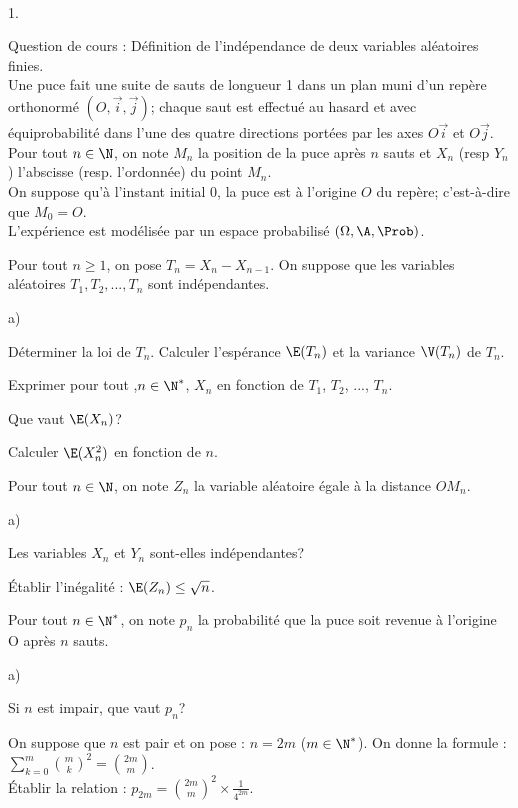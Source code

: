 \documentclass[11pt]{article}%
\begin{document}
\begin{exerciceAP}~
  \begin{noliste}{1.}
    \setlength{\itemsep}{2mm}
  \item Question de cours : Définition de l'indépendance de deux
    variables aléatoires finies.\\ 
    Une puce fait une suite de sauts de longueur 1 dans un plan muni
    d'un repère orthonormé $(O, \vec{i}, \vec{j})$; chaque saut est
    effectué au hasard et avec équiprobabilité dans l'une des quatre
    directions portées par les axes $O \vec{i}$ et $O \vec{j}$.\\ 
    Pour tout $n \in \N$, on note $M_n$ la position de la puce après
    $n$ sauts et $X_n$ (resp $Y_n$) l'abscisse (resp. l'ordonnée) du
    point $M_n$.\\ 
    On suppose qu'à l'instant initial 0, la puce est à l'origine $O$
    du repère; c'est-à-dire que $M_0=O$.\\ 
    L'expérience est modélisée par un espace probabilisé $(\Omega, \A,
    \Prob)$.
  \item Pour tout $n \geq 1$, on pose $T_n= X_n- X_{n-1}$. On suppose
    que les variables aléatoires $T_1, T_2, ..., T_n$ sont
    indépendantes. 
    \begin{noliste}{a)}
    \setlength{\itemsep}{2mm}
    \item Déterminer la loi de $T_n$. Calculer l'espérance $\E(T_n)$
      et la variance $\V(T_n)$ de $T_n$.
    \item Exprimer pour tout ,$n \in \N^*$, $X_n$ en fonction de
      $T_1$, $T_2$, ..., $T_n$.
    \item Que vaut $\E(X_n)$?
    \item Calculer $\E(X_n^2)$ en fonction de $n$.
    \end{noliste}
  \item Pour tout $n \in \N$, on note $Z_n$ la variable aléatoire
    égale à la distance $O M_n$.
    \begin{noliste}{a)}
    \setlength{\itemsep}{2mm}
    \item Les variables $X_n$ et $Y_n$ sont-elles indépendantes?
    \item Établir l'inégalité : $\E(Z_n) \leq \sqrt{n}$.
    \end{noliste}
  \item Pour tout $n \in \N^*$, on note $p_n$ la probabilité que la
    puce soit revenue à l'origine O après $n$ sauts.
    \begin{noliste}{a)}
    \setlength{\itemsep}{2mm}
    \item Si $n$ est impair, que vaut $p_n$? 
    \item On suppose que $n$ est pair et on pose : $n=2m$ ($m \in
      \N^*$). On donne la formule : $\sum \limits_{k=0}^m \binom{m}{k}
      ^2 = \binom{2m}{m}$.\\
      Établir la relation : $p_{2m}= \binom{2m}{m}^2 \times
      \frac{1}{4^{2m}}$.
    \end{noliste}
  \end{noliste}
\end{exerciceAP}
\end{document}
